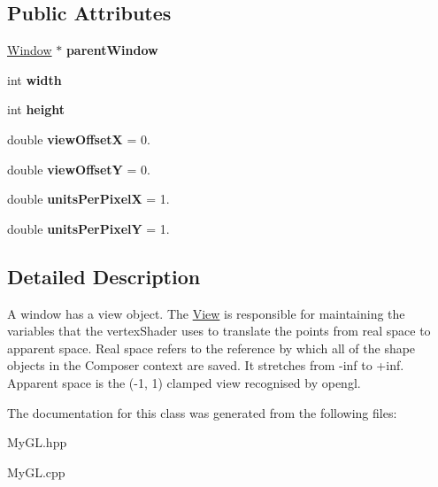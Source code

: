 \subsection*{Public Attributes}
\begin{DoxyCompactItemize}
\item 
\hyperlink{classWindow}{Window} $\ast$ {\bfseries parent\+Window}\hypertarget{classView_ae047212bfa12abf0f0a57bf604e020ba}{}\label{classView_ae047212bfa12abf0f0a57bf604e020ba}

\item 
int {\bfseries width}\hypertarget{classView_ae039aa744b085db819ae149705b2c32b}{}\label{classView_ae039aa744b085db819ae149705b2c32b}

\item 
int {\bfseries height}\hypertarget{classView_a6e3e5c18893617490f02166641356746}{}\label{classView_a6e3e5c18893617490f02166641356746}

\item 
double {\bfseries view\+OffsetX} = 0.\hypertarget{classView_a9b210244771d77ebcc08e5f9e9862922}{}\label{classView_a9b210244771d77ebcc08e5f9e9862922}

\item 
double {\bfseries view\+OffsetY} = 0.\hypertarget{classView_ae18f735f6c322277e5788fa56bb9c758}{}\label{classView_ae18f735f6c322277e5788fa56bb9c758}

\item 
double {\bfseries units\+Per\+PixelX} = 1.\hypertarget{classView_ad2318a59fa2280eab8b7a59d317f4e5a}{}\label{classView_ad2318a59fa2280eab8b7a59d317f4e5a}

\item 
double {\bfseries units\+Per\+PixelY} = 1.\hypertarget{classView_a28db7efdb0540ef7cdc49934ecb79893}{}\label{classView_a28db7efdb0540ef7cdc49934ecb79893}

\end{DoxyCompactItemize}


\subsection{Detailed Description}
A window has a view object. The \hyperlink{classView}{View} is responsible for maintaining the variables that the vertex\+Shader uses to translate the points from real space to apparent space. Real space refers to the reference by which all of the shape objects in the Composer context are saved. It stretches from -\/inf to +inf. Apparent space is the (-\/1, 1) clamped view recognised by opengl. 

The documentation for this class was generated from the following files\+:\begin{DoxyCompactItemize}
\item 
My\+G\+L.\+hpp\item 
My\+G\+L.\+cpp\end{DoxyCompactItemize}
